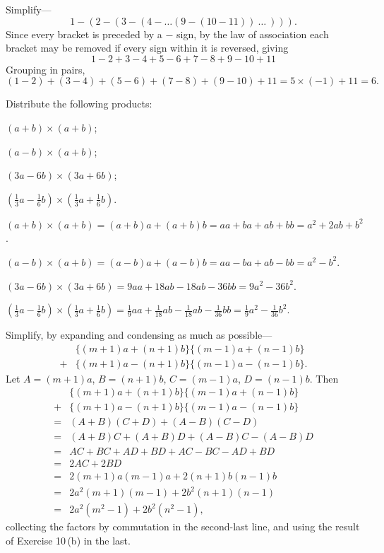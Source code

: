 \documentclass[DIN, pagenumber=false, fontsize=11pt, parskip=half]{scrartcl}
\begin{document}
\begin{problems}[from=1,step=1]
    \problem Simplify---
    \[
        1 - (2 - (3 - (4 - \dots (9 - (10 - 11))\ \dots\ ))).
    \]
    \answer Since every bracket is preceded by a $-$ sign, by the law of association each bracket may be removed if every sign within it is reversed, giving
    \[
        1 - 2 + 3 - 4 + 5 - 6 + 7 - 8 + 9 - 10 + 11
    \]
    Grouping in pairs,
    \[
        (1 - 2) + (3 - 4) + (5 - 6) + (7 - 8) + (9 - 10) + 11 = 5 \times (-1) + 11 = 6.
    \]

    \problem Distribute the following products:
    \begin{parts}
        \item $(a+b) \times (a+b)$;
        \item $(a-b) \times (a+b)$;
        \item $(3a - 6b) \times (3a + 6b)$;
        \item $(\tfrac{1}{3}a - \tfrac{1}{6}b) \times (\tfrac{1}{3}a + \tfrac{1}{6}b)$.
    \end{parts}
    \answer 
    \begin{parts}
        \item $(a+b) \times (a+b) = (a+b)a + (a+b)b = aa + ba + ab + bb = a^2+2ab+b^2$.
        \item $(a-b)\times(a+b) = (a-b)a + (a-b)b = aa - ba + ab - bb = a^2-b^2$.
        \item $(3a-6b) \times (3a+6b) = 9aa + 18ab - 18ab - 36bb = 9a^2 - 36b^2$.
        \item $(\tfrac{1}{3}a-\tfrac{1}{6}b)\times(\tfrac{1}{3}a+\tfrac{1}{6}b) = \tfrac{1}{9}aa + \tfrac{1}{18}ab - \tfrac{1}{18}ab - \tfrac{1}{36}bb = \tfrac{1}{9}a^2-\tfrac{1}{36}b^2$.
    \end{parts}

    \problem Simplify, by expanding and condensing as much as possible---
    \begin{align*}
        &\{(m+1)a + (n+1)b\}\{(m-1)a + (n-1)b\} \\
        {}+{} &\{(m+1)a - (n+1)b\}\{(m-1)a - (n-1)b\}.
    \end{align*}
    \answer
    Let $A = (m+1)a$, $B = (n+1)b$, $C = (m-1)a$, $D = (n-1)b$. Then
    \begin{align*}
        &\{(m+1)a + (n+1)b\}\{(m-1)a+(n-1)b\}\\
        {}+{} &\{(m+1)a-(n+1)b\}\{(m-1)a-(n-1)b\}\\ 
        {}={} &(A+B)(C+D) + (A-B)(C-D)\\ 
        {}={} &(A+B)C+(A+B)D + (A-B)C-(A-B)D\\ 
        {}={} &AC+BC+AD+BD+AC-BC-AD+BD\\ 
        {}={} &2AC+2BD\\ 
        {}={} &2(m+1)a(m-1)a + 2(n+1)b(n-1)b\\ 
        {}={} &2a^2(m+1)(m-1) + 2b^2(n+1)(n-1)\\ 
        {}={} &2a^2(m^2-1) + 2b^2(n^2-1),
    \end{align*}
    collecting the factors by commutation in the second-last line, and using the result of Exercise 10\,(b) in the last.


\end{problems}
\end{document}

